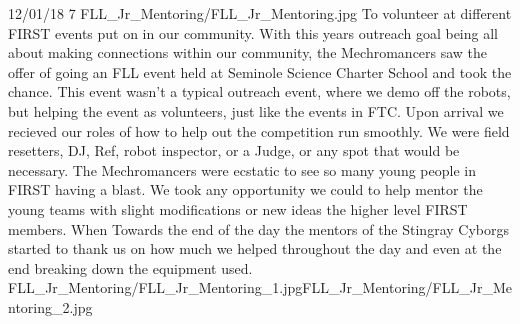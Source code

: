{12/01/18}
{7}
{FLL_Jr_Mentoring/FLL_Jr_Mentoring.jpg}
{To volunteer at different FIRST events put on in our community.} 
{
	With this years outreach goal being all about making connections within our community, the Mechromancers saw the offer of going 
an FLL event held at Seminole Science Charter School and took the chance. This event wasn't a typical outreach event, where we demo off the robots, but helping the event as volunteers, just like the events in FTC. Upon arrival we recieved our roles of how to help out the competition run smoothly. We were field resetters, DJ, Ref, robot inspector, or a Judge, or any spot that would be necessary. The Mechromancers were ecstatic to see so many young people in FIRST having a blast. We took any opportunity we could to help mentor the young teams with slight modifications or new ideas the higher level FIRST members. When Towards the end of the day the mentors of the Stingray Cyborgs started to thank us on how much we helped throughout the day and even at the end breaking down the equipment used.  
} 
{FLL_Jr_Mentoring/FLL_Jr_Mentoring_1.jpg}{FLL_Jr_Mentoring/FLL_Jr_Mentoring_2.jpg}